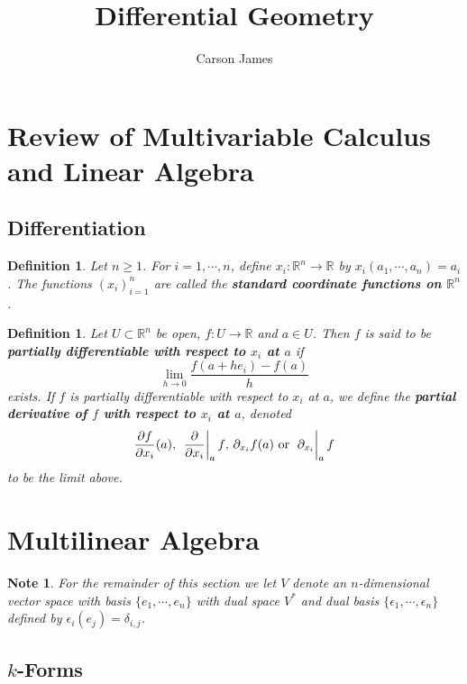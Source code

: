 \documentclass[12pt]{amsart}
\newtheorem{defn}[thm]{Definition}
\newtheorem{note}[thm]{Note}
\newcommand{\del}{\delta}
\newcommand{\ep}{\epsilon}
\newcommand{\R}{\mathbb{R}}
\begin{document}
	
	\title{Differential Geometry}
	\author{Carson James}
	\maketitle
	
	\tableofcontents
	
	\section{Review of Multivariable Calculus and Linear Algebra}
	
	\subsection{Differentiation}
	
	\begin{defn}
		Let $n \geq 1$. For $i = 1, \cdots, n$, define $x_i: \R^n \rightarrow \R$ by $x_i(a_1, \cdots, a_n) = a_i$. The functions $(x_i)_{i=1}^n$ are called the \textbf{standard coordinate functions on $\R^n$}. 
	\end{defn}
	
	\begin{defn}
		Let $U \subset \R^n$ be open, $f: U \rightarrow \R$ and $a \in U$. Then $f$ is said to be \textbf{partially differentiable with respect to $x_i$ at $a$} if $$\lim\limits_{h \rightarrow 0} \frac{f(a + he_i) - f(a)}{h}$$ exists. If $f$ is partially differentiable with respect to $x_i$ at $a$, we define the \textbf{partial derivative of $f$ with respect to $x_i$ at $a$}, denoted $$\frac{\partial f}{\partial x_i} (a) \text{, } \eval{\pdv{x_i}}_{a} f \text{, } \partial_{x_i} f (a) \text{ or } \eval{\partial_{x_i}}_{a} f$$ to be the limit above.
	\end{defn}

\newpage
	\section{Multilinear Algebra}
	
	\begin{note}
		For the remainder of this section we let $V$ denote an $n$-dimensional vector space with basis $\{e_1, \cdots, e_n\}$ with dual space $V^*$ and dual basis $\{\ep_1, \cdots, \ep_n\}$ defined by $\ep_i(e_j) = \del_{i,j}$.
	\end{note}

	\subsection{$k$-Forms}
	
\end{document}
